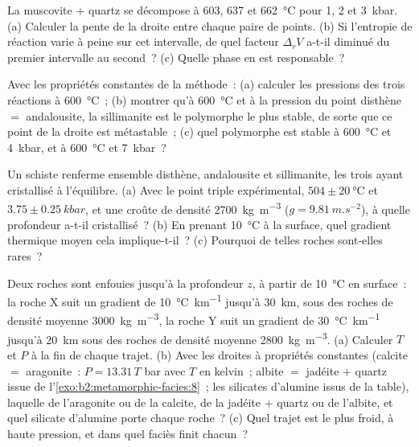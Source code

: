 \begin{exercise}[$\star\star$]\label{exo:b2:metamorphic-facies:9}
La muscovite + quartz se décompose à 603, 637 et \qty{662}{\celsius} pour 1, 2 et
\qty{3}{kbar}. (a) Calculer la pente de la droite entre chaque paire de points. (b) Si
l'entropie de réaction varie à peine sur cet intervalle, de quel facteur $\Delta_r V$
a-t-il diminué du premier intervalle au second~? (c) Quelle phase en est responsable~?
\end{exercise}

\begin{exercise}[$\star\star\star$]\label{exo:b2:metamorphic-facies:10}
Avec les propriétés constantes de la méthode~: (a) calculer les pressions des trois
réactions à \qty{600}{\celsius}~; (b) montrer qu'à \qty{600}{\celsius} et à la pression du
point disthène $=$ andalousite, la sillimanite est le polymorphe le plus stable, de sorte que ce point de
la droite est métastable~; (c) quel polymorphe est stable à \qty{600}{\celsius} et
\qty{4}{kbar}, et à \qty{600}{\celsius} et \qty{7}{kbar}~?
\end{exercise}

\begin{exercise}[$\star\star\star$]\label{exo:b2:metamorphic-facies:11}
Un schiste renferme ensemble disthène, andalousite et sillimanite, les trois ayant cristallisé à
l'équilibre. (a) Avec le point triple expérimental, $504 \pm \qty{20}{\celsius}$ et
$3.75 \pm \qty{0.25}{kbar}$, et une croûte de densité \qty{2700}{kg.m^{-3}} ($g =
\qty{9.81}{m.s^{-2}}$), à quelle profondeur a-t-il cristallisé~? (b) En prenant \qty{10}{\celsius} à la
surface, quel gradient thermique moyen cela implique-t-il~? (c) Pourquoi de telles roches sont-elles rares~?
\end{exercise}

\begin{exercise}[$\star\star\star$]\label{exo:b2:metamorphic-facies:12}
Deux roches sont enfouies jusqu'à la profondeur $z$, à partir de \qty{10}{\celsius} en surface~: la roche X suit
un gradient de \qty{10}{\celsius.km^{-1}} jusqu'à \qty{30}{km}, sous des roches de densité moyenne
\qty{3000}{kg.m^{-3}}, la roche Y suit un gradient de \qty{30}{\celsius.km^{-1}} jusqu'à \qty{20}{km} sous des roches
de densité moyenne \qty{2800}{kg.m^{-3}}. (a) Calculer $T$ et $P$ à la fin de chaque trajet.
(b) Avec les droites à propriétés constantes (calcite $=$ aragonite~: $P = 13.31\,T$ bar avec $T$
en kelvin~; albite $=$ jadéite + quartz issue de l'\cref{exo:b2:metamorphic-facies:8}~; les silicates d'alumine issus de la
table), laquelle de l'aragonite ou de la calcite, de la jadéite + quartz ou de l'albite, et quel
silicate d'alumine porte chaque roche~? (c) Quel trajet est le plus froid, à haute pression, et dans quel faciès finit chacun~?
\end{exercise}

